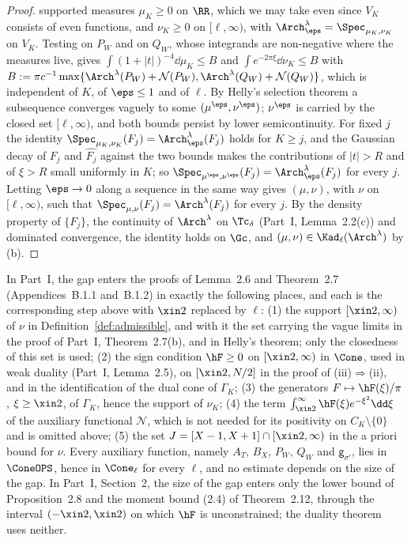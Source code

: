 \begin{proof}
supported measures $\mu_K\ge0$ on $\RR$, which we may take even since $V_K$ consists of even functions, and $\nu_K\ge0$ on $[\ell,\infty)$, with
$\Arch^\lambda_\eps=\Spec_{\mu_K,\nu_K}$ on $V_K$. Testing on $P_W$ and on $Q_W$, whose integrands are non-negative where the measures live, gives
$\int(1+|t|)^{-4}\dd\mu_K\le B$ and $\int e^{-2\pi\xi}\dd\nu_K\le B$ with $B:=\pi c^{-1}\max\{\Arch^\lambda(P_W)+\mathcal N(P_W),
\Arch^\lambda(Q_W)+\mathcal N(Q_W)\}$, which is independent of $K$, of $\eps\le1$ and of $\ell$. By Helly's selection theorem a subsequence converges
vaguely to some $(\mu^\eps,\nu^\eps)$; $\nu^\eps$ is carried by the closed set $[\ell,\infty)$, and both bounds persist by lower semicontinuity. For fixed
$j$ the identity $\Spec_{\mu_K,\nu_K}(F_j)=\Arch^\lambda_\eps(F_j)$ holds for $K\ge j$, and the Gaussian decay of $F_j$ and $\widehat{F_j}$ against the
two bounds makes the contributions of $|t|>R$ and of $\xi>R$ small uniformly in $K$; so $\Spec_{\mu^\eps,\nu^\eps}(F_j)=\Arch^\lambda_\eps(F_j)$ for every
$j$. Letting $\eps\to0$ along a sequence in the same way gives $(\mu,\nu)$, with $\nu$ on $[\ell,\infty)$, such that
$\Spec_{\mu,\nu}(F_j)=\Arch^\lambda(F_j)$ for every $j$. By the density property of $\{F_j\}$, the continuity of $\Arch^\lambda$ on $\Tc_\delta$
(Part~I, Lemma~2.2(c)) and dominated convergence, the identity holds on $\Gc$, and $(\mu,\nu)\in\Kad_\ell(\Arch^\lambda)$ by (b).
\end{proof}

\begin{remark}\label{rem:gap-uses}
In Part~I, the gap enters the proofs of Lemma~2.6 and Theorem~2.7 (Appendices~B.1.1 and~B.1.2) in exactly the following places, and each is
the corresponding step above with $\xin2$ replaced by $\ell$: (1) the support $[\xin2,\infty)$ of $\nu$ in Definition~\ref{def:admissible}, and with it the set
carrying the vague limits in the proof of Part~I, Theorem~2.7(b), and in Helly's theorem; only the closedness of this set is used; (2) the sign condition
$\hF\ge0$ on $[\xin2,\infty)$ in $\Cone$, used in weak duality (Part~I, Lemma~2.5), on $[\xin2,N/2]$ in the proof of (iii)$\Rightarrow$(ii), and in the
identification of the dual cone of $\Gamma_K$; (3) the generators $F\mapsto\hF(\xi)/\pi$, $\xi\ge\xin2$, of $\Gamma_K$, hence the support of $\nu_K$;
(4) the term $\int_{\xin2}^\infty\hF(\xi)e^{-\xi^2}\dd\xi$ of the auxiliary functional $\mathcal N$, which is not needed for its positivity on
$C_K\setminus\{0\}$ and is omitted above; (5) the set $J=[X-1,X+1]\cap[\xin2,\infty)$ in the a priori bound for $\nu$. Every auxiliary function,
namely $A_T$, $B_X$, $P_W$, $Q_W$ and $\mathsf g_{\sigma'}$, lies in $\ConeOPS$, hence in $\Cone_\ell$ for every $\ell$, and no estimate depends on the size of the
gap. In Part~I, Section~2, the size of the gap enters only the lower bound of Proposition~2.8 and the moment bound (2.4) of Theorem~2.12,
through the interval $(-\xin2,\xin2)$ on which $\hF$ is unconstrained; the duality theorem uses neither.
\end{remark}

